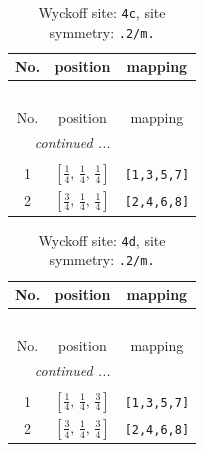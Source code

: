 \documentclass[fleqn,8pt]{jsarticle}
\begin{document}
\renewcommand{\arraystretch}{1.2}
\begin{longtable}{ccc}
\caption{Wyckoff site: {\tt 4c}, site symmetry: {\tt .2/m.}}
 \\
 \hline \hline
No. & position & mapping \\ \hline \endfirsthead

\multicolumn{2}{l}{\tablename\ \thetable{}} \\
 \hline \hline
No. & position & mapping \\ \hline \endhead

 \hline \hline
\multicolumn{2}{r}{\footnotesize\it continued ...} \\ \endfoot

 \hline \hline
\multicolumn{2}{r}{} \\ \endlastfoot

1 & $\left[ \frac{1}{4},\, \frac{1}{4},\, \frac{1}{4} \right]$ & {\tt [1,3,5,7]} \\ \hline
2 & $\left[ \frac{3}{4},\, \frac{1}{4},\, \frac{1}{4} \right]$ & {\tt [2,4,6,8]} \\
\end{longtable}
\renewcommand{\arraystretch}{1.2}
\begin{longtable}{ccc}
\caption{Wyckoff site: {\tt 4d}, site symmetry: {\tt .2/m.}}
 \\
 \hline \hline
No. & position & mapping \\ \hline \endfirsthead

\multicolumn{2}{l}{\tablename\ \thetable{}} \\
 \hline \hline
No. & position & mapping \\ \hline \endhead

 \hline \hline
\multicolumn{2}{r}{\footnotesize\it continued ...} \\ \endfoot

 \hline \hline
\multicolumn{2}{r}{} \\ \endlastfoot

1 & $\left[ \frac{1}{4},\, \frac{1}{4},\, \frac{3}{4} \right]$ & {\tt [1,3,5,7]} \\ \hline
2 & $\left[ \frac{3}{4},\, \frac{1}{4},\, \frac{3}{4} \right]$ & {\tt [2,4,6,8]} \\
\end{longtable}
\renewcommand{\arraystretch}{1.2}
\end{document}
